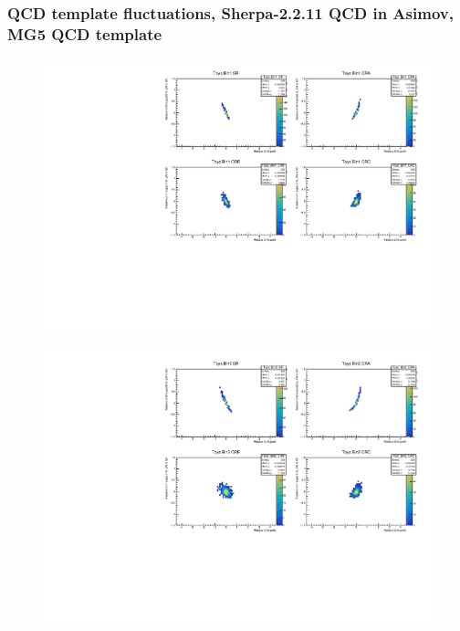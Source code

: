 \subsubsection{\mjj QCD template fluctuations, Sherpa-2.2.11 QCD in Asimov, MG5 QCD template}
\begin{figure}[H]
\includegraphics[width=\textwidth]{plots/diffx/instab/constfx/instabilities_mjj_QCD_Mgraph_Signal_Sh2211_BSMCQCDSTATS_sherpaasimov_bin1.pdf}
\end{figure}
\begin{figure}[H]
\includegraphics[width=\textwidth]{plots/diffx/instab/constfx/instabilities_mjj_QCD_Mgraph_Signal_Sh2211_BSMCQCDSTATS_sherpaasimov_bin2.pdf}
\end{figure}
